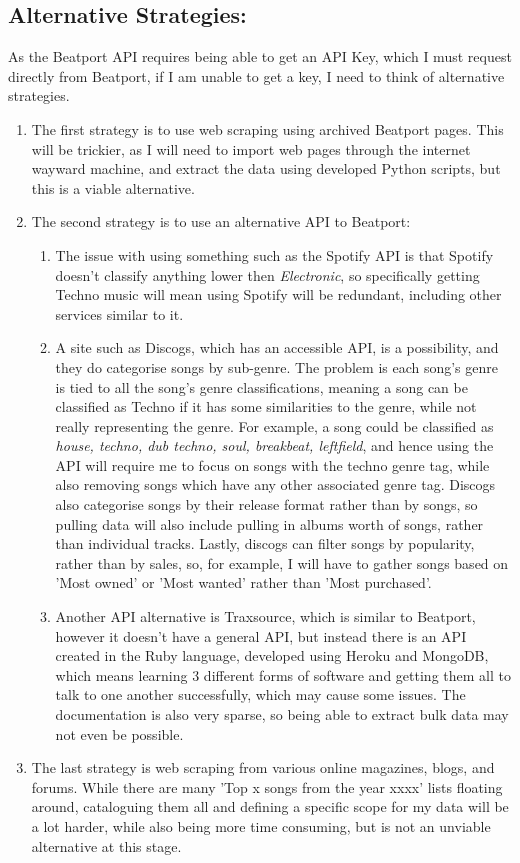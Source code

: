 \documentclass{article}
\begin{document}
\subsection{Alternative Strategies:}
As the Beatport API requires being able to get an API Key, which I must request directly from Beatport, if I am unable to get a key, I need to think of alternative strategies.
\begin{enumerate}
    \item The first strategy is to use web scraping using archived Beatport pages. This will be trickier, as I will need to import web pages through the internet wayward machine, and extract the data using developed Python scripts, but this is a viable alternative.
    \item The second strategy is to use an alternative API to Beatport:
    \begin{enumerate}
        \item The issue with using something such as the Spotify API is that Spotify doesn't classify anything lower then \textit{Electronic}, so specifically getting Techno music will mean using Spotify will be redundant, including other services similar to it.
        \item A site such as Discogs, which has an accessible API, is a possibility, and they do categorise songs by sub-genre. The problem is each song's genre is tied to all the song's genre classifications, meaning a song can be classified as Techno if it has some similarities to the genre, while not really representing the genre. For example, a song could be classified as \textit{house, techno, dub techno, soul, breakbeat, leftfield}, and hence using the API will require me to focus on songs with the techno genre tag, while also removing songs which have any other associated genre tag. Discogs also categorise songs by their release format rather than by songs, so pulling data will also include pulling in albums worth of songs, rather than individual tracks. Lastly, discogs can filter songs by popularity, rather than by sales, so, for example, I will have to gather songs based on 'Most owned' or 'Most wanted' rather than 'Most purchased'.
        \item Another API alternative is Traxsource, which is similar to Beatport, however it doesn't have a general API, but instead there is an API created in the Ruby language, developed using Heroku and MongoDB, which means learning 3 different forms of software and getting them all to talk to one another successfully, which may cause some issues. The documentation is also very sparse, so being able to extract bulk data may not even be possible. 
    \end{enumerate}
    \item The last strategy is web scraping from various online magazines, blogs, and forums. While there are many 'Top x songs from the year xxxx' lists floating around, cataloguing them all and defining a specific scope for my data will be a lot harder, while also being more time consuming, but is not an unviable alternative at this stage.  
\end{enumerate}
\end{document}
